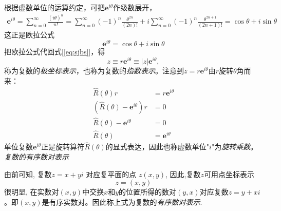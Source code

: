 根据虚数单位的运算约定，可把$\boldsymbol{e}^{i \theta}$作级数展开，
\[ \begin{aligned}
  \boldsymbol{e}^{i \theta}=\sum_{n=0}^{\infty} \frac{(i \theta)^{n}}{n!} 
  =\sum_{n=0}^{\infty}(-1)^{n} \frac{\theta^{2 n}}{(2 n)!}+i \sum_{n=0}^{\infty}(-1)^{n} \frac{\theta^{2 n+1}}{(2 n+1)!}
  =\operatorname{cos}\theta+i \operatorname{sin}\theta 
\end{aligned}\]
这正是欧拉公式 
\begin{equation}
    \boldsymbol{e}^{i \theta} = \operatorname{cos}\theta+i \operatorname{sin}\theta  
\end{equation}
把欧拉公式代回式[\ref{eq:sjbs}]，得 
\begin{equation}\label{}
    z \equiv  r \boldsymbol{e}^{i \theta} \equiv  |z| \boldsymbol{e}^{i \theta}, 
\end{equation}
称为复数的\emph{极坐标表示}，也称为复数的\emph{指数表示}。注意到$z = r \boldsymbol{e}^{i \theta} $由$r$旋转$\theta$角而来：
$$ \begin{aligned}
  \hat{R}(\theta)r &=  r \boldsymbol{e}^{i \theta}  \\
  (\hat{R}(\theta) - \boldsymbol{e}^{i \theta}) r &= 0 \\
  \hat{R}(\theta) - \boldsymbol{e}^{i \theta} &=0 \\
  \hat{R}(\theta) &=\boldsymbol{e}^{i \theta}
\end{aligned}$$ 
单位复数$\boldsymbol{e}^{i \theta}$正是旋转算符$\hat{R}(\theta)$的显式表达，因此也称虚数单位"$i$"为\emph{旋转乘数}。 \\

\noindent \emph{复数的有序数对表示} 

由前可知, 复数$z = x+yi$ 对应复平面的点 $z(x,y)$, 因此,复数$z$可用点坐标表示
\begin{equation}\label{}
    z= (x,y) 
\end{equation}
很明显, 在实数对$(x,y)$中交换$x$和$y$的位置所得的数对$(y,x)$对应复数$z= y+x i$。即$(x,y)$是有序实数对。因此称上式为复数的\emph{有序数对表示}.

